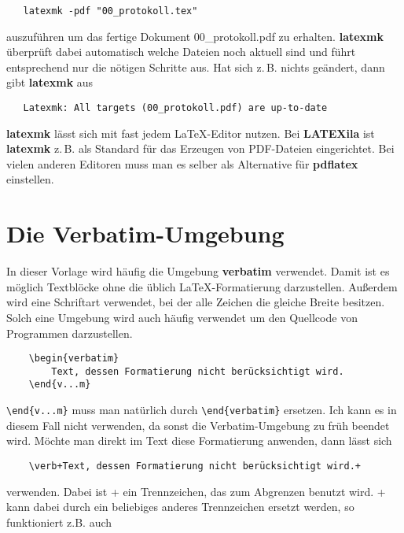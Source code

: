\begin{verbatim}
   latexmk -pdf "00_protokoll.tex"
\end{verbatim}

auszuführen um das fertige Dokument 00\_protokoll.pdf zu erhalten. \textbf{latexmk} überprüft dabei automatisch welche Dateien noch aktuell sind und führt entsprechend nur die nötigen Schritte aus. Hat sich z.\,B. nichts geändert, dann gibt \textbf{latexmk} aus 

\begin{verbatim}
   Latexmk: All targets (00_protokoll.pdf) are up-to-date
\end{verbatim}

\textbf{latexmk} lässt sich mit fast jedem \LaTeX-Editor nutzen. Bei \textbf{LATEXila} ist \textbf{latexmk} z.\,B. als Standard für das Erzeugen von PDF-Dateien eingerichtet. Bei vielen anderen Editoren muss man es selber als Alternative für \textbf{pdflatex} einstellen.

\section{Die Verbatim-Umgebung}

In dieser Vorlage wird häufig die Umgebung \textbf{verbatim} verwendet. Damit ist es möglich Textblöcke ohne die üblich \LaTeX-Formatierung darzustellen. Außerdem wird eine Schriftart verwendet, bei der alle Zeichen die gleiche Breite besitzen. Solch eine Umgebung wird auch häufig verwendet um den Quellcode von Programmen darzustellen.

\begin{verbatim}
    \begin{verbatim}
        Text, dessen Formatierung nicht berücksichtigt wird.
    \end{v...m}
\end{verbatim}

\verb+\end{v...m}+ muss man natürlich durch \verb+\end{verbatim}+ ersetzen. Ich kann es in diesem Fall nicht verwenden, da sonst die Verbatim-Umgebung zu früh beendet wird. Möchte man direkt im Text diese Formatierung anwenden, dann lässt sich 

\begin{verbatim}
    \verb+Text, dessen Formatierung nicht berücksichtigt wird.+
\end{verbatim}

verwenden. Dabei ist + ein Trennzeichen, das zum Abgrenzen benutzt wird. + kann dabei durch ein beliebiges anderes Trennzeichen ersetzt werden, so funktioniert z.B. auch

